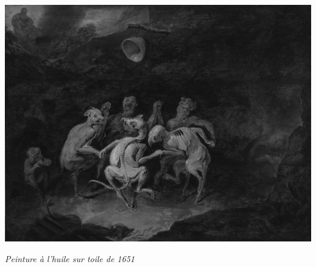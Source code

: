 \vfill

%





\begin{center}

\includegraphics[width=0.55\linewidth]{immagini/David_Ryckaert_III_La_Ronde_des_farfadets_grayscale.png}

\medskip

\emph{Peinture à l'huile sur toile de 1651}

\end{center}

%
%
%

\pagebreak

